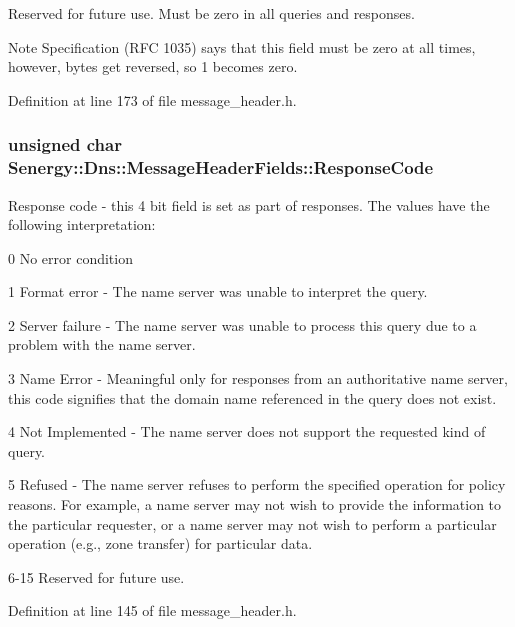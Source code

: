 Reserved for future use. Must be zero in all queries and responses. 

\begin{DoxyNote}{Note}
Specification (R\-F\-C 1035) says that this field must be zero at all times, however, bytes get reversed, so 1 becomes zero. 
\end{DoxyNote}


Definition at line 173 of file message\-\_\-header.\-h.

\hypertarget{struct_senergy_1_1_dns_1_1_message_header_fields_a2f42c94d4e50dd7a63b11c8b374597c4}{
\subsubsection[{Response\-Code}]{\setlength{\rightskip}{0pt plus 5cm}unsigned char Senergy\-::\-Dns\-::\-Message\-Header\-Fields\-::\-Response\-Code}}\label{struct_senergy_1_1_dns_1_1_message_header_fields_a2f42c94d4e50dd7a63b11c8b374597c4}


Response code -\/ this 4 bit field is set as part of responses. The values have the following interpretation\-: 

0 No error condition

1 Format error -\/ The name server was unable to interpret the query.

2 Server failure -\/ The name server was unable to process this query due to a problem with the name server.

3 Name Error -\/ Meaningful only for responses from an authoritative name server, this code signifies that the domain name referenced in the query does not exist.

4 Not Implemented -\/ The name server does not support the requested kind of query.

5 Refused -\/ The name server refuses to perform the specified operation for policy reasons. For example, a name server may not wish to provide the information to the particular requester, or a name server may not wish to perform a particular operation (e.\-g., zone transfer) for particular data.

6-\/15 Reserved for future use. 

Definition at line 145 of file message\-\_\-header.\-h.

